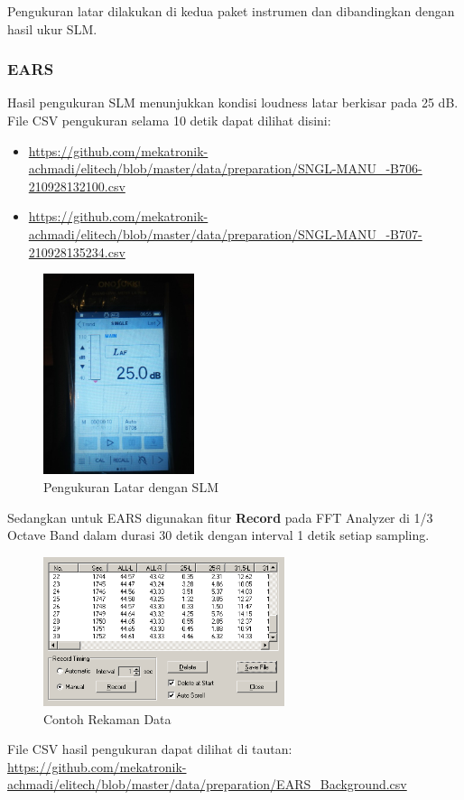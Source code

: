 \documentclass[12pt,]{article}
\begin{document}
	Pengukuran latar dilakukan di kedua paket instrumen dan dibandingkan dengan hasil ukur SLM.
	
	\subsubsection{EARS}
	
	Hasil pengukuran SLM menunjukkan kondisi loudness latar berkisar pada 25 dB.
	File CSV pengukuran selama 10 detik dapat dilihat disini:
	\begin{itemize}
		\item \url{https://github.com/mekatronik-achmadi/elitech/blob/master/data/preparation/SNGL-MANU_-B706-210928132100.csv}
		\item \url{https://github.com/mekatronik-achmadi/elitech/blob/master/data/preparation/SNGL-MANU_-B707-210928135234.csv}
	\end{itemize}
	
	\newpage
	\begin{figure}[!ht]
		\centering
		\includegraphics[width=125pt]{images/slm_latar}
		\caption{Pengukuran Latar dengan SLM}
	\end{figure}

	Sedangkan untuk EARS digunakan fitur \textbf{Record} pada FFT Analyzer di 1/3 Octave Band
	dalam durasi 30 detik dengan interval 1 detik setiap sampling.
	
	\begin{figure}[!ht]
		\centering
		\includegraphics[width=200pt]{images/datarec}
		\caption{Contoh Rekaman Data}
	\end{figure}

	File CSV hasil pengukuran dapat dilihat di tautan:
	\url{https://github.com/mekatronik-achmadi/elitech/blob/master/data/preparation/EARS_Background.csv}
	
\end{document}
